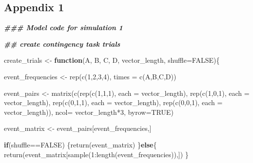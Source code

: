 \documentclass[
  english,
  man,floatsintext]{apa6}
\newenvironment{Shaded}{\begin{snugshade}}{\end{snugshade}}
\newcommand{\DecValTok}[1]{\textcolor[rgb]{0.00,0.00,0.81}{#1}}
\newcommand{\ConstantTok}[1]{\textcolor[rgb]{0.00,0.00,0.00}{#1}}
\newcommand{\SpecialCharTok}[1]{\textcolor[rgb]{0.00,0.00,0.00}{#1}}
\newcommand{\DocumentationTok}[1]{\textcolor[rgb]{0.56,0.35,0.01}{\textbf{\textit{#1}}}}
\newcommand{\OtherTok}[1]{\textcolor[rgb]{0.56,0.35,0.01}{#1}}
\newcommand{\FunctionTok}[1]{\textcolor[rgb]{0.00,0.00,0.00}{#1}}
\newcommand{\ControlFlowTok}[1]{\textcolor[rgb]{0.13,0.29,0.53}{\textbf{#1}}}
\newcommand{\AttributeTok}[1]{\textcolor[rgb]{0.77,0.63,0.00}{#1}}
\newcommand{\NormalTok}[1]{#1}
\begin{document}
\endgroup


\clearpage
\makeatletter
\efloat@restorefloats
\makeatother


\begin{appendix}
\hypertarget{appendix-1}{%
\section{Appendix 1}\label{appendix-1}}

\begin{Shaded}
\begin{Highlighting}[]
\DocumentationTok{\#\#\# Model code for simulation 1}

\DocumentationTok{\#\# create contingency task trials}

\NormalTok{create\_trials }\OtherTok{\textless{}{-}} \ControlFlowTok{function}\NormalTok{(A, B, C, D, vector\_length, }\AttributeTok{shuffle=}\ConstantTok{FALSE}\NormalTok{)\{}

\NormalTok{  event\_frequencies }\OtherTok{\textless{}{-}} \FunctionTok{rep}\NormalTok{(}\FunctionTok{c}\NormalTok{(}\DecValTok{1}\NormalTok{,}\DecValTok{2}\NormalTok{,}\DecValTok{3}\NormalTok{,}\DecValTok{4}\NormalTok{), }\AttributeTok{times =} \FunctionTok{c}\NormalTok{(A,B,C,D))}

\NormalTok{  event\_pairs }\OtherTok{\textless{}{-}} \FunctionTok{matrix}\NormalTok{(}\FunctionTok{c}\NormalTok{(}\FunctionTok{rep}\NormalTok{(}\FunctionTok{c}\NormalTok{(}\DecValTok{1}\NormalTok{,}\DecValTok{1}\NormalTok{,}\DecValTok{1}\NormalTok{), }\AttributeTok{each =}\NormalTok{ vector\_length),}
\FunctionTok{rep}\NormalTok{(}\FunctionTok{c}\NormalTok{(}\DecValTok{1}\NormalTok{,}\DecValTok{0}\NormalTok{,}\DecValTok{1}\NormalTok{), }\AttributeTok{each =}\NormalTok{ vector\_length),}
\FunctionTok{rep}\NormalTok{(}\FunctionTok{c}\NormalTok{(}\DecValTok{0}\NormalTok{,}\DecValTok{1}\NormalTok{,}\DecValTok{1}\NormalTok{), }\AttributeTok{each =}\NormalTok{ vector\_length),}
\FunctionTok{rep}\NormalTok{(}\FunctionTok{c}\NormalTok{(}\DecValTok{0}\NormalTok{,}\DecValTok{0}\NormalTok{,}\DecValTok{1}\NormalTok{), }\AttributeTok{each =}\NormalTok{ vector\_length)),}
\AttributeTok{ncol=}\NormalTok{ vector\_length}\SpecialCharTok{*}\DecValTok{3}\NormalTok{,}
\AttributeTok{byrow=}\ConstantTok{TRUE}\NormalTok{)}

\NormalTok{  event\_matrix }\OtherTok{\textless{}{-}}\NormalTok{ event\_pairs[event\_frequencies,]}

\ControlFlowTok{if}\NormalTok{(shuffle}\SpecialCharTok{==}\ConstantTok{FALSE}\NormalTok{) \{}\FunctionTok{return}\NormalTok{(event\_matrix)}
\NormalTok{    \}}\ControlFlowTok{else}\NormalTok{\{}
\FunctionTok{return}\NormalTok{(event\_matrix[}\FunctionTok{sample}\NormalTok{(}\DecValTok{1}\SpecialCharTok{:}\FunctionTok{length}\NormalTok{(event\_frequencies)),])}
\NormalTok{    \}}


\end{Highlighting}
\end{Shaded}
\end{appendix}
\end{document}
